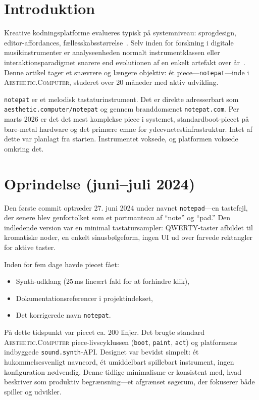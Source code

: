 \documentclass[10pt,letterpaper,twocolumn]{article}
\newcommand{\ac}{\textsc{Aesthetic.Computer}}
\begin{document}
\section{Introduktion}

Kreative kodningsplatforme evalueres typisk på systemniveau: sprogdesign, editor-affordances, fællesskabsstørrelse~\citep{reas2007processing,mccarthy2015p5js,resnick2009scratch}. Selv inden for forskning i digitale musikinstrumenter er analyseenheden normalt instrumentklassen eller interaktionsparadigmet snarere end evolutionen af en enkelt artefakt over år~\citep{magnusson2010designing,marquez2018dmi}. Denne artikel tager et snævrere og længere objektiv: ét piece---\texttt{notepat}---inde i \ac{}, studeret over 20 måneder med aktiv udvikling.

\texttt{notepat} er et melodisk tastaturinstrument. Det er direkte adresserbart som \texttt{aesthetic.computer/notepat} og gennem branddomænet \texttt{notepat.com}. Per marts 2026 er det det mest komplekse piece i systemet, standardboot-piecet på bare-metal hardware og det primære emne for ydeevnetestinfrastruktur. Intet af dette var planlagt fra starten. Instrumentet voksede, og platformen voksede omkring det.

\section{Oprindelse (juni--juli 2024)}

Den første commit optræder 27. juni 2024 under navnet \texttt{notepad}---en tastefejl, der senere blev genfortolket som et portmanteau af ``note'' og ``pad.'' Den indledende version var en minimal tastatursampler: QWERTY-taster afbildet til kromatiske noder, en enkelt sinusbølgeform, ingen UI ud over farvede rektangler for aktive taster.

Inden for fem dage havde piecet fået:
\begin{itemize}
  \item Synth-udklang (25\,ms lineært fald for at forhindre klik),
  \item Dokumentationsreferencer i projektindekset,
  \item Det korrigerede navn \texttt{notepat}.
\end{itemize}

På dette tidspunkt var piecet ca. 200 linjer. Det brugte standard \ac{} piece-livscyklussen (\texttt{boot}, \texttt{paint}, \texttt{act}) og platformens indbyggede \texttt{sound.synth}-API. Designet var bevidst simpelt: ét hukommelsesvenligt navneord, ét umiddelbart spillebart instrument, ingen konfiguration nødvendig. Denne tidlige minimalisme er konsistent med, hvad \citet{magnusson2010designing} beskriver som produktiv begrænsning---et afgrænset søgerum, der fokuserer både spiller og udvikler.
\end{document}
